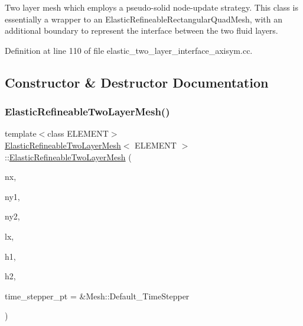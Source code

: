Two layer mesh which employs a pseudo-\/solid node-\/update strategy. This class is essentially a wrapper to an Elastic\+Refineable\+Rectangular\+Quad\+Mesh, with an additional boundary to represent the interface between the two fluid layers. 

Definition at line 110 of file elastic\+\_\+two\+\_\+layer\+\_\+interface\+\_\+axisym.\+cc.



\subsection{Constructor \& Destructor Documentation}
\mbox{\label{classElasticRefineableTwoLayerMesh_a868e53937a6cd94e2ff252fe2002a216}} 
\subsubsection{\texorpdfstring{Elastic\+Refineable\+Two\+Layer\+Mesh()}{ElasticRefineableTwoLayerMesh()}}
{\footnotesize\ttfamily template$<$class E\+L\+E\+M\+E\+NT$>$ \\
\hyperlink{classElasticRefineableTwoLayerMesh}{Elastic\+Refineable\+Two\+Layer\+Mesh}$<$ E\+L\+E\+M\+E\+NT $>$\+::\hyperlink{classElasticRefineableTwoLayerMesh}{Elastic\+Refineable\+Two\+Layer\+Mesh} (\begin{DoxyParamCaption}\item[{const unsigned \&}]{nx,  }\item[{const unsigned \&}]{ny1,  }\item[{const unsigned \&}]{ny2,  }\item[{const double \&}]{lx,  }\item[{const double \&}]{h1,  }\item[{const double \&}]{h2,  }\item[{Time\+Stepper $\ast$}]{time\+\_\+stepper\+\_\+pt = {\ttfamily \&Mesh\+:\+:Default\+\_\+TimeStepper} }\end{DoxyParamCaption})\hspace{0.3cm}{\ttfamily [inline]}}



